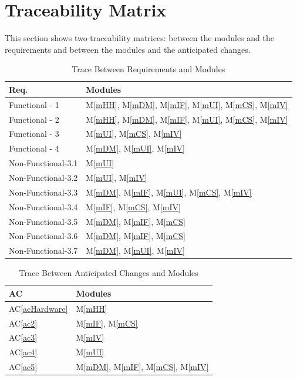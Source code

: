 \documentclass[12pt, titlepage]{article}
\newcommand{\acref}[1]{AC\ref{#1}}
\newcommand{\mref}[1]{M\ref{#1}}
\begin{document}
\section{Traceability Matrix} \label{SecTM}

This section shows two traceability matrices: between the modules and the
requirements and between the modules and the anticipated changes.

\begin{table}[H]
\centering
\begin{tabular}{p{} p{}}
\toprule
\textbf{Req.} & \textbf{Modules}\\
\midrule
Functional - 1 & \mref{mHH}, \mref{mDM}, \mref{mIF}, \mref{mUI}, \mref{mCS}, \mref{mIV} \\
Functional - 2 & \mref{mHH}, \mref{mDM}, \mref{mIF}, \mref{mUI}, \mref{mCS}, \mref{mIV}\\
Functional - 3 & \mref{mUI}, \mref{mCS}, \mref{mIV} \\
Functional - 4 & \mref{mDM}, \mref{mUI}, \mref{mIV}\\
Non-Functional-3.1 & \mref{mUI}\\
Non-Functional-3.2 & \mref{mUI}, \mref{mIV}\\
Non-Functional-3.3 & \mref{mDM}, \mref{mIF}, \mref{mUI}, \mref{mCS}, \mref{mIV}\\
Non-Functional-3.4 & \mref{mIF}, \mref{mCS}, \mref{mIV}\\
Non-Functional-3.5 & \mref{mDM}, \mref{mIF}, \mref{mCS}\\
Non-Functional-3.6 & \mref{mDM}, \mref{mIF}, \mref{mCS}\\
Non-Functional-3.7 & \mref{mDM}, \mref{mUI}, \mref{mIV}\\
\bottomrule
\end{tabular}
\caption{Trace Between Requirements and Modules}
\label{TblRT}
\end{table}

\begin{table}[H]
\centering
\begin{tabular}{p{} p{}}
\toprule
\textbf{AC} & \textbf{Modules}\\
\midrule
\acref{acHardware} & \mref{mHH}\\
\acref{ac2} & \mref{mIF}, \mref{mCS}\\
\acref{ac3} & \mref{mIV}\\
\acref{ac4} & \mref{mUI}\\
\acref{ac5} & \mref{mDM}, \mref{mIF}, \mref{mCS}, \mref{mIV}\\

\bottomrule
\end{tabular}
\caption{Trace Between Anticipated Changes and Modules}
\label{TblACT}
\end{table}
\end{document}
